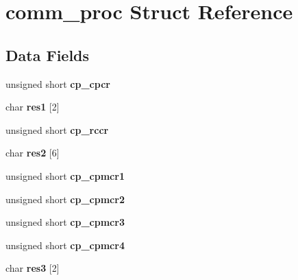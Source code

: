 \hypertarget{structcomm__proc}{}\section{comm\+\_\+proc Struct Reference}
\label{structcomm__proc}
\subsection*{Data Fields}
\begin{DoxyCompactItemize}
\item 
\mbox{\label{structcomm__proc_a0be2e734df7179f0aae9afc636168838}} 
unsigned short {\bfseries cp\+\_\+cpcr}
\item 
\mbox{\label{structcomm__proc_aaa7801e903027c32a5c9848acb801947}} 
char {\bfseries res1} \mbox{[}2\mbox{]}
\item 
\mbox{\label{structcomm__proc_ae1dd88ee419c146fa5c05e8f4ddc4fd9}} 
unsigned short {\bfseries cp\+\_\+rccr}
\item 
\mbox{\label{structcomm__proc_aa4cf0900b0fd9b44cd7429ef40e1ae8b}} 
char {\bfseries res2} \mbox{[}6\mbox{]}
\item 
\mbox{\label{structcomm__proc_a9fb96386f2aded69e0ce2a2a59c09d77}} 
unsigned short {\bfseries cp\+\_\+cpmcr1}
\item 
\mbox{\label{structcomm__proc_ab7f10b09f9a47c5b8b07c7e4c124c8cd}} 
unsigned short {\bfseries cp\+\_\+cpmcr2}
\item 
\mbox{\label{structcomm__proc_a1c65ad15a3f33b8b070795bdaa86e9e4}} 
unsigned short {\bfseries cp\+\_\+cpmcr3}
\item 
\mbox{\label{structcomm__proc_acf5f9554f399ce09f78c15258f2310a0}} 
unsigned short {\bfseries cp\+\_\+cpmcr4}
\item 
\mbox{\label{structcomm__proc_a574e8e2b3338354cbad30afb619681e7}} 
char {\bfseries res3} \mbox{[}2\mbox{]}
\item 
\mbox{\label{structcomm__proc_a01a70d3b393c5677fbc2470bc7738f5e}} 

\end{DoxyCompactItemize}

